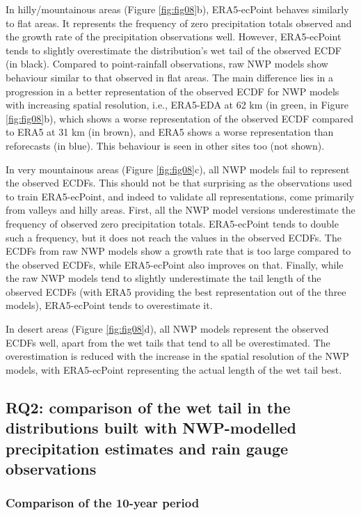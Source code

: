 \documentclass{ametsocV6.1}
\begin{document}
In hilly/mountainous areas (Figure \ref{fig:fig08}b), ERA5-ecPoint behaves similarly to flat areas. It represents the frequency of zero precipitation totals observed and the growth rate of the precipitation observations well. However, ERA5-ecPoint tends to slightly overestimate the distribution's wet tail of the observed ECDF (in black). Compared to point-rainfall observations, raw NWP models show behaviour similar to that observed in flat areas. The main difference lies in a progression in a better representation of the observed ECDF for NWP models with increasing spatial resolution, i.e., ERA5-EDA at 62 km (in green, in Figure \ref{fig:fig08}b), which shows a worse representation of the observed ECDF compared to ERA5 at 31 km (in brown), and ERA5 shows a worse representation than reforecasts (in blue). This behaviour is seen in other sites too (not shown). 

In very mountainous areas (Figure \ref{fig:fig08}c), all NWP models fail to represent the observed ECDFs. This should not be that surprising as the observations used to train ERA5-ecPoint, and indeed to validate all representations, come primarily from valleys and hilly areas. First, all the NWP model versions underestimate the frequency of observed zero precipitation totals. ERA5-ecPoint tends to double such a frequency, but it does not reach the values in the observed ECDFs. The ECDFs from raw NWP models show a growth rate that is too large compared to the observed ECDFs, while ERA5-ecPoint also improves on that. Finally, while the raw NWP models tend to slightly underestimate the tail length of the observed ECDFs (with ERA5 providing the best representation out of the three models), ERA5-ecPoint tends to overestimate it. 

In desert areas (Figure \ref{fig:fig08}d), all NWP models represent the observed ECDFs well, apart from the wet tails that tend to all be overestimated. The overestimation is reduced with the increase in the spatial resolution of the NWP models, with ERA5-ecPoint representing the actual length of the wet tail best.


\subsection{RQ2: comparison of the wet tail in the distributions built with NWP-modelled precipitation estimates and rain gauge observations}

\subsubsection{Comparison of the 10-year period}
\end{document}
